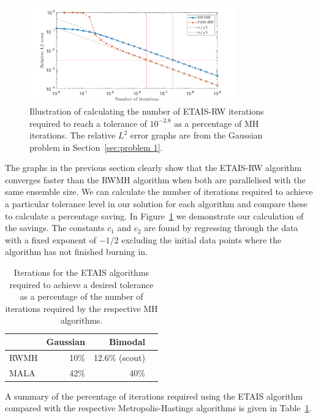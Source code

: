 \documentclass[final]{siamltex}
\begin{document}
\begin{figure}
\begin{center}
\includegraphics[width=0.8\textwidth]{"figures/calc_saving"}
\caption{Illustration of calculating the number of ETAIS-RW iterations
required to reach a tolerance of $10^{-2.8}$ as a percentage of MH
iterations. The relative $L^2$ error graphs are from the Gaussian
problem in Section~\ref{sec:problem 1}.}
\label{fig:calc_saving}
\end{center}
\end{figure}

The graphs in the previous section clearly show that the ETAIS-RW
algorithm converges faster than the RWMH algorithm when both are
parallelised with the same ensemble size. We can calculate the number
of iterations required to achieve a particular tolerance level in our
solution for each algorithm and compare these to calculate a
percentage saving. In Figure~\ref{fig:calc_saving} we demonstrate our
calculation of the savings. The constants $c_1$ and $c_2$ are found by
regressing through the data with a fixed exponent of $-1/2$ excluding
the initial data points where the algorithm has not finished burning
in.

\begin{table}[!ht]
\centering
\begin{tabular}{|l|r|r|r|}
\hline
		& Gaussian & Bimodal \\ \hline
	RWMH & 10\% & 12.6\% (scout) \\
	MALA & 42\% & 40\% \\ \hline
\end{tabular}
\vspace{2mm}
\caption{Iterations for the ETAIS algorithms required to achieve a
desired tolerance as a percentage of the number of iterations required
by the respective MH algorithms.}
\label{table:calc_savings}
\end{table}

A summary of the percentage of iterations required using the ETAIS
algorithm compared with the respective Metropolis-Hastings algorithms
is given in Table~\ref{table:calc_savings}.
\end{document}

